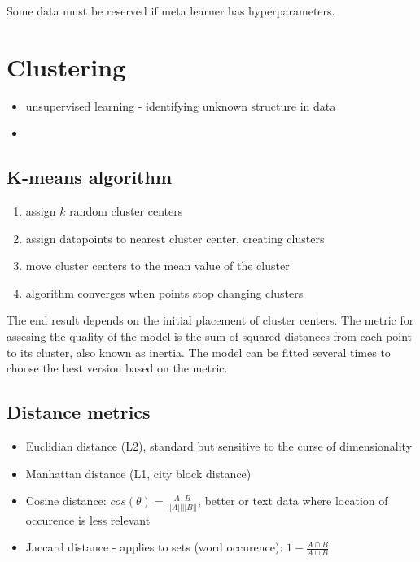 \documentclass[11pt]{book}
\begin{document}
Some data must be reserved if meta learner has hyperparameters. 

\section{Clustering}

\begin{itemize}
    \item unsupervised learning - identifying unknown structure in data
    \item 
\end{itemize}

\subsection{K-means algorithm}

\begin{enumerate}
    \item assign $k$ random cluster centers
    \item assign datapoints to nearest cluster center, creating clusters
    \item move cluster centers to the mean value of the cluster
    \item algorithm converges when points stop changing clusters
\end{enumerate}

The end result depends on the initial placement of cluster centers. The metric for assesing the quality of the model is the sum of squared distances from each point to its cluster, also known as inertia. The model can be fitted several times to choose the best version based on the metric. 

\subsection{Distance metrics}

\begin{itemize}
    \item Euclidian distance (L2), standard but sensitive to the curse of dimensionality
    \item Manhattan distance (L1, city block distance)
    \item Cosine distance: $cos(\theta)=\frac{A\cdot B}{||A||||B||}$, better or text data where location of occurence is less relevant
    \item Jaccard distance - applies to sets (word occurence): $1-\frac{A \cap B}{A \cup B}$
\end{itemize}
\end{document}
